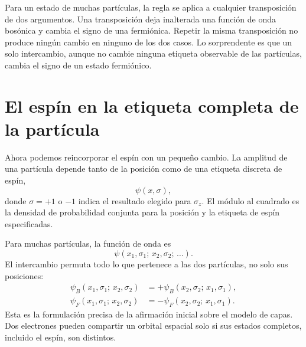 Para un estado de muchas partículas, la regla se aplica a cualquier transposición de dos argumentos. Una transposición deja inalterada una función de onda bosónica y cambia el signo de una fermiónica. Repetir la misma transposición no produce ningún cambio en ninguno de los dos casos. Lo sorprendente es que un solo intercambio, aunque no cambie ninguna etiqueta observable de las partículas, cambia el signo de un estado fermiónico.

\section{El espín en la etiqueta completa de la partícula}

Ahora podemos reincorporar el espín con un pequeño cambio. La amplitud de una partícula depende tanto de la posición como de una etiqueta discreta de espín,
\begin{equation}
\psi(x,\sigma),
\end{equation}
donde \(\sigma=+1\) o \(-1\) indica el resultado elegido para \(\sigma_z\). El módulo al cuadrado es la densidad de probabilidad conjunta para la posición y la etiqueta de espín especificadas.

Para muchas partículas, la función de onda es
\begin{equation}
\psi(x_1,\sigma_1;\,x_2,\sigma_2;\,\ldots).
\end{equation}
El intercambio permuta todo lo que pertenece a las dos partículas, no solo sus posiciones:
\begin{align}
\psi_B(x_1,\sigma_1;\,x_2,\sigma_2)
&=
+\psi_B(x_2,\sigma_2;\,x_1,\sigma_1),\\
\psi_F(x_1,\sigma_1;\,x_2,\sigma_2)
&=
-\psi_F(x_2,\sigma_2;\,x_1,\sigma_1).
\end{align}
Esta es la formulación precisa de la afirmación inicial sobre el modelo de capas. Dos electrones pueden compartir un orbital espacial solo si sus estados completos, incluido el espín, son distintos.

\begin{classroomqa}
\end{classroomqa}

\begin{classroomqa}
\end{classroomqa}

